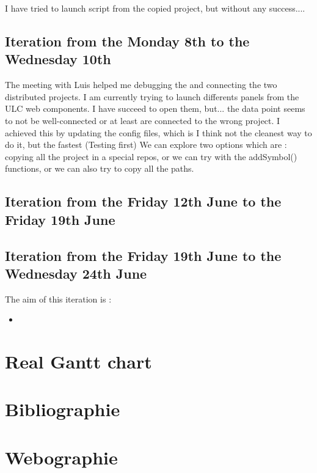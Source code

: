 \documentclass[a4paper, 12pt]{article}
\begin{document}
I have tried to launch script from the copied project, but without any success....

\subsection{Iteration from the Monday 8th to the Wednesday 10th}
The meeting with Luis helped me debugging the and connecting the two distributed projects. I am currently trying to launch differents panels from the ULC web components.
I have succeed to open them, but... the data point seems to not be well-connected or at least are connected to the wrong project.
I achieved this by updating the config files, which is I think not the cleanest way to do it, but the fastest (Testing first)
We can explore two options which are : copying all the project in a special repos, or we can try with the addSymbol() functions, or we can also try to copy all the paths.

\subsection{Iteration from the Friday 12th June to the Friday 19th June}

\subsection{Iteration from the Friday 19th June to the Wednesday 24th June}
The aim of this iteration is : 
\begin{itemize}
    \item 
\end{itemize}

\newpage
\section{Real Gantt chart}

\section{Bibliographie}


\nocite{*}
\printbibliography

\section{Webographie}
\end{document}
